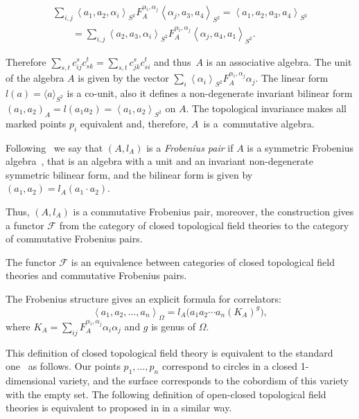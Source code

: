 \documentclass[pdftex]{sigma}
\def \lc {\left<}
\def \rc {\right>}
\begin{document}
\begin{gather*}
\sum_{i,j}
\lc a_1,a_2,\alpha_i \rc_{S^2} F_A^{\alpha_i,\alpha_j} \lc \alpha_j,a_3,a_4 \rc_{S^2}= \lc a_1,a_2,a_3,a_4 \rc_{S^2}\\
\qquad{} = \sum_{i,j}
\lc a_2,a_3,\alpha_i \rc_{S^2}F_A^{\alpha_i,\alpha_j} \lc \alpha_j,a_4,a_1 \rc_{S^2}.
\end{gather*}


Therefore
$\sum_{s,t}c_{ij}^{s}c_{sk}^{t}=\sum_{s,t}c_{jk}^{s}c_{si}^{t}$ and
thus~$A$ is an associative algebra. The unit of the algebra $A$ is given by the vector
$\sum_{i} \lc \alpha_i \rc_{S^2} F^{\alpha_i,\alpha_j}_A\alpha_j$.
The linear form $l(a)=\langle a\rangle_{S^2}$ is a co-unit, also it def\/ines
a non-degenerate invariant bilinear form
$(a_1,a_2)_{A}=l(a_1a_2)= \lc a_1,a_2 \rc_{S^2}$ on $A$. The topological invariance
makes all marked points $p_i$ equivalent and, therefore, $A$~is a~commutative algebra.


Following~\cite{AN2} we say that $(A,l_A)$ is a {\em Frobenius pair} if $A$ is a symmetric
Frobenius algebra~\cite{F}, that is an algebra with
a unit and an invariant non-degenerate symmetric bilinear form, and
the bilinear form is given by $(a_1,a_2) = l_A(a_1\cdot a_2)$.



Thus, $(A,l_A)$ is a commutative Frobenius pair,
moreover, the construction gives a functor $\mathcal{F}$ from the
category of closed topological f\/ield theories to the category of
commutative Frobenius pairs.



\begin{theorem}[\cite{D2}] The functor $\mathcal{F}$ is an equivalence
between categories of closed topological field theories and commutative
Frobenius pairs.
\end{theorem}

The Frobenius structure gives an explicit formula for correlators:
\[
\lc a_1,a_2,\dots ,a_n \rc_{\Omega}=l_A\big(a_1a_2\cdots a_n \left(K_A\right)^g\big),
\] where
$K_A=\sum_{ij}F^{\alpha_i,\alpha_j}_A\alpha_i\alpha_j$ and $g$ is
genus of $\Omega$.

\begin{note}
This def\/inition of closed topological f\/ield theory is equivalent
to the standard one~\cite{At} as follows. Our points $p_1, \dots, p_n$
correspond to circles in a closed 1-dimensional variety,
and the surface corresponds to the cobordism of this variety with
the empty set. The following def\/inition of open-closed topological f\/ield theories is equivalent to proposed in \cite{Laz,MS} in a similar way.
\end{note}
\end{document}
